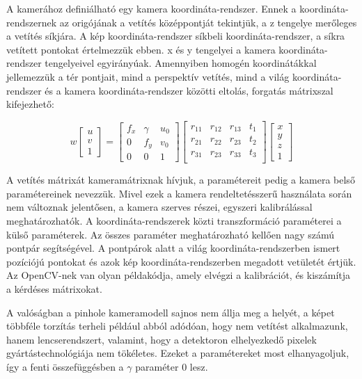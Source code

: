 \documentclass{article}
\begin{document}
	
A kamerához definiálható egy kamera koordináta-rendszer. Ennek a koordináta-rendszernek az origójának a vetítés középpontját tekintjük, a z tengelye merőleges a vetítés síkjára. A kép koordináta-rendszer síkbeli koordináta-rendszer, a síkra vetített pontokat értelmezzük ebben. x és y tengelyei a kamera koordináta-rendszer tengelyeivel egyirányúak. Amennyiben homogén koordinátákkal jellemezzük a tér pontjait, mind a perspektív vetítés, mind a világ koordináta-rendszer és a kamera koordináta-rendszer közötti eltolás, forgatás mátrixszal kifejezhető: 

\begin{equation}
w\left[
\begin{array}{c}
u \\ v \\ 1
\end{array}
\right] = \left[ 
\begin{array}{ccc}
f_x & \gamma & u_0 \\
0 & f_y & v_0 \\
0 & 0 & 1
\end{array}
\right]\left[
\begin{array}{cccc}
r_{11} & r_{12} & r_{13} & t_1 \\
r_{21} & r_{22} & r_{23} & t_2 \\
r_{31} & r_{23} & r_{33} & t_3 \\
\end{array}
\right]\left[
\begin{array}{c}
x \\ y \\ z \\ 1
\end{array}
\right]
\end{equation}
 
A vetítés mátrixát kameramátrixnak hívjuk, a paramétereit pedig a kamera belső paramétereinek nevezzük. Mivel ezek a kamera rendeltetésszerű használata során nem változnak jelentősen, a kamera szerves részei, egyszeri kalibrálással meghatározhatók. A koordináta-rendszerek közti transzformáció paraméterei a külső paraméterek. Az összes paraméter meghatározható kellően nagy számú pontpár segítségével. A pontpárok alatt a világ koordináta-rendszerben ismert pozíciójú pontokat és azok kép koordináta-rendszerben megadott vetületét értjük. Az OpenCV-nek van olyan példakódja, amely elvégzi a kalibrációt, és kiszámítja a kérdéses mátrixokat.

A valóságban a pinhole kameramodell sajnos nem állja meg a helyét, a képet többféle torzítás terheli például abból adódóan, hogy nem vetítést alkalmazunk, hanem lencserendszert, valamint, hogy a detektoron elhelyezkedő pixelek gyártástechnológiája nem tökéletes. Ezeket a paramétereket most elhanyagoljuk, így a fenti összefüggésben a $\gamma$ paraméter 0 lesz.
\end{document}
